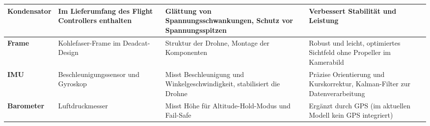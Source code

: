 \begin{longtable}{|l|p{4cm}|p{4cm}|p{4cm}|}
	\textbf{Kondensator}      & Im Lieferumfang des Flight Controllers enthalten                                                                  & Glättung von Spannungsschwankungen, Schutz vor Spannungsspitzen                                                           & Verbessert Stabilität und Leistung                                                                             \\ \hline
	\textbf{Frame}            & Kohlefaser-Frame im Deadcat-Design                                                                                & Struktur der Drohne, Montage der Komponenten                                                                              & Robust und leicht, optimiertes Sichtfeld ohne Propeller im Kamerabild                                          \\ \hline
	\textbf{IMU}              & Beschleunigungssensor und Gyroskop                                                                                & Misst Beschleunigung und Winkelgeschwindigkeit, stabilisiert die Drohne                                                   & Präzise Orientierung und Kurskorrektur, Kalman-Filter zur Datenverarbeitung                     \\ \hline
	\textbf{Barometer}        & Luftdruckmesser                                                                                                  & Misst Höhe für Altitude-Hold-Modus und Fail-Safe                                                                         & Ergänzt durch GPS (im aktuellen Modell kein GPS integriert)                                         \\ \hline
	
\end{longtable}